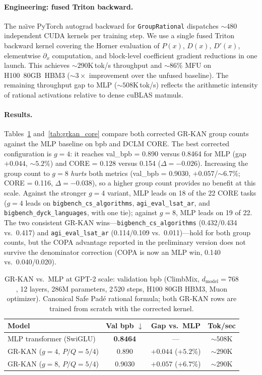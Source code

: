 \documentclass{article}
\newcommand{\grkan}{\textsc{GR-KAN}}
\begin{document}
\paragraph{Engineering: fused Triton backward.}
The na\"{\i}ve PyTorch autograd backward for \texttt{GroupRational} dispatches
${\sim}480$ independent CUDA kernels per training step.
We use a single fused Triton backward kernel covering the Horner
evaluation of $P(x)$, $D(x)$, $D'(x)$, elementwise $\partial_x$ computation, and
block-level coefficient gradient reductions in one launch.
This achieves ${\sim}290$K\,tok/s throughput and ${\sim}86\%$ MFU on H100~80GB~HBM3
(${\sim}3\times$ improvement over the unfused baseline).
The remaining throughput gap to MLP (${\sim}508$K\,tok/s) reflects the arithmetic
intensity of rational activations relative to dense cuBLAS matmuls.

\paragraph{Results.}
Tables~\ref{tab:grkan_gpt2} and~\ref{tab:grkan_core} compare both corrected
\grkan{} group counts against the MLP baseline on bpb and DCLM CORE.
The best corrected configuration is $g=4$: it reaches val\_bpb = 0.890 versus
0.8464 for MLP (gap $+0.044$, $\sim5.2\%$) and CORE = 0.128 versus 0.154
($\Delta=-0.026$).
Increasing the group count to $g=8$ \emph{hurts} both metrics
(val\_bpb = 0.9030, $+0.057$/$\sim6.7\%$; CORE = 0.116, $\Delta=-0.038$), so a
higher group count provides no benefit at this scale.
Against the stronger $g=4$ variant, MLP leads on 18 of the 22 CORE tasks
($g=4$ leads on \texttt{bigbench\_cs\_algorithms}, \texttt{agi\_eval\_lsat\_ar},
and \texttt{bigbench\_dyck\_languages}, with one tie); against $g=8$, MLP leads on
19 of 22.
The two consistent \grkan{} wins---\texttt{bigbench\_cs\_algorithms}
(0.432/0.434 vs.\ 0.417) and \texttt{agi\_eval\_lsat\_ar} (0.114/0.109 vs.\
0.011)---hold for both group counts, but the COPA advantage reported in the
preliminary version does not survive the denominator correction (COPA is now an
MLP win, 0.140 vs.\ 0.040/0.020).

\begin{table}[h]
\centering
\caption{%
  \grkan{} vs.\ MLP at GPT-2 scale: validation bpb
  (ClimbMix, $d_\text{model}=768$, 12 layers, 286M parameters, 2\,520 steps,
  H100 80GB HBM3, Muon optimizer).
  Canonical Safe Pad\'{e} rational formula; both \grkan{} rows are trained from
  scratch with the corrected kernel.
}
\label{tab:grkan_gpt2}
\begin{tabular}{lccc}
\toprule
Model & Val bpb $\downarrow$ & Gap vs.\ MLP & Tok/sec \\
\midrule
MLP transformer (SwiGLU) & \textbf{0.8464} & --- & ${\sim}508$K \\
\grkan{} ($g=4$, $P/Q=5/4$) & 0.890 & $+0.044$ ($+5.2\%$) & ${\sim}290$K \\
\grkan{} ($g=8$, $P/Q=5/4$) & 0.9030 & $+0.057$ ($+6.7\%$) & ${\sim}290$K \\
\bottomrule
\end{tabular}
\end{table}
\end{document}
